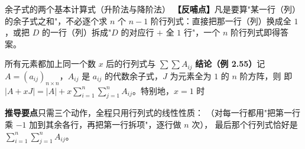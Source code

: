 \begin{fdeep}{余子式的两个基本计算式（升阶法与降阶法）}
\textbf{【反哺点】}凡是要算"某一行（列）的余子式之和"，不必逐个求 $n$ 个 $n-1$ 阶行列式：直接把那一行（列）换成全 $1$，或把 $D$ 的一行（列）拆成"$D$ 的对应行 $+$ 全 $1$ 行"，一个 $n$ 阶行列式即得答案。
\end{fdeep}


\begin{fdeep}{所有元素都加上同一个数 $x$ 后的行列式与 $\sum\sum A_{ij}$}
\textbf{结论（例 2.55）}\quad 记 $A=(a_{ij})_{n\times n}$，$A_{ij}$ 是 $a_{ij}$ 的代数余子式，$J$ 为元素全为 $1$ 的 $n$ 阶方阵，则
即 $|A+xJ|=|A|+x\sum\limits_{i=1}^{n}\sum\limits_{j=1}^{n}A_{ij}$。特别地，$x=1$ 时

\textbf{推导要点}\quad 只需三个动作，全程只用行列式的线性性质：
（对每一行都用"把第一行乘 $-1$ 加到其余各行，再把第一行拆项"，逐行做 $n$ 次），
最后那个行列式恰好是 $\sum\limits_{i=1}^{n}\sum\limits_{j=1}^{n}A_{ij}$。


\end{fdeep}
